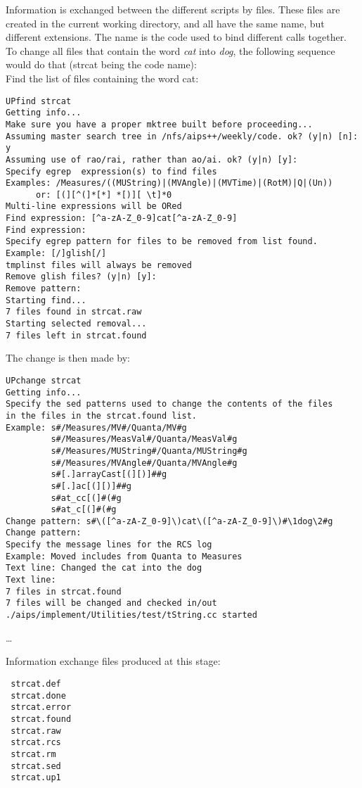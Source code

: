 Information is exchanged between the different scripts by files. These files
are created in the current working directory, and all have the same name, but
different extensions. The name is the code used to bind different calls
together. To change all files that contain the word {\em cat} into {\em dog},
the following sequence would do that (strcat being the code name): \\
Find the list of files containing the word cat:
\begin{verbatim}
UPfind strcat
Getting info...
Make sure you have a proper mktree built before proceeding...
Assuming master search tree in /nfs/aips++/weekly/code. ok? (y|n) [n]: y
Assuming use of rao/rai, rather than ao/ai. ok? (y|n) [y]: 
Specify egrep  expression(s) to find files
Examples: /Measures/((MUString)|(MVAngle)|(MVTime)|(RotM)|Q|(Un))
      or: [(][^(]*[*] *[)][ \t]*0
Multi-line expressions will be ORed
Find expression: [^a-zA-Z_0-9]cat[^a-zA-Z_0-9]   
Find expression: 
Specify egrep pattern for files to be removed from list found.
Example: [/]glish[/]
tmplinst files will always be removed
Remove glish files? (y|n) [y]: 
Remove pattern: 
Starting find...
7 files found in strcat.raw
Starting selected removal...
7 files left in strcat.found
\end{verbatim}

The change is then made by:
\begin{verbatim}
UPchange strcat
Getting info...
Specify the sed patterns used to change the contents of the files 
in the files in the strcat.found list. 
Example: s#/Measures/MV#/Quanta/MV#g
         s#/Measures/MeasVal#/Quanta/MeasVal#g
         s#/Measures/MUString#/Quanta/MUString#g
         s#/Measures/MVAngle#/Quanta/MVAngle#g
         s#[.]arrayCast[(][)]##g
         s#[.]ac[(][)]##g
         s#at_cc[(]#(#g
         s#at_c[(]#(#g
Change pattern: s#\([^a-zA-Z_0-9]\)cat\([^a-zA-Z_0-9]\)#\1dog\2#g
Change pattern: 
Specify the message lines for the RCS log
Example: Moved includes from Quanta to Measures
Text line: Changed the cat into the dog
Text line: 
7 files in strcat.found
7 files will be changed and checked in/out
./aips/implement/Utilities/test/tString.cc started
\end{verbatim}
\ldots

Information exchange files produced at this stage:
\begin{verbatim}
 strcat.def
 strcat.done
 strcat.error
 strcat.found
 strcat.raw
 strcat.rcs
 strcat.rm
 strcat.sed
 strcat.up1
\end{verbatim}

